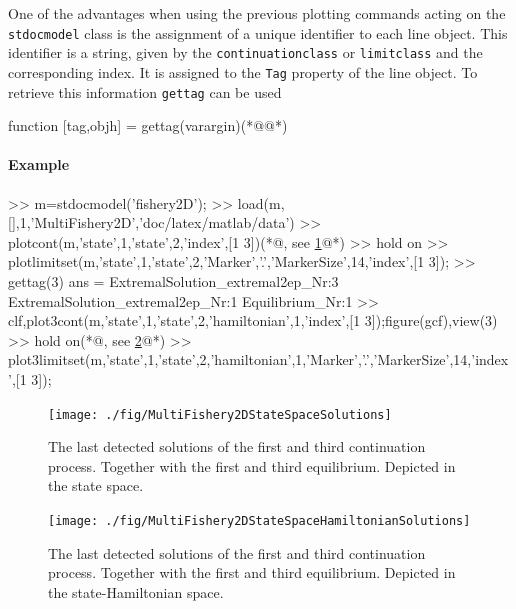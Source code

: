 One of the advantages when using the previous plotting commands acting on the \lstinline+stdocmodel+ class is the assignment of a unique identifier to each line object. This identifier is a string, given by the \lstinline+continuationclass+ or \lstinline+limitclass+ and the corresponding index. It is assigned to the \lstinline+Tag+ property of the line object. To retrieve this information \lstinline+gettag+ can be used
\begin{matlab}
function [tag,objh] = gettag(varargin)(*@@*)
%
%
%
\end{matlab}
\paragraph{Example}
\begin{matlab}
>> m=stdocmodel('fishery2D');
>> load(m,[],1,'MultiFishery2D','doc/latex/matlab/data')
>> plotcont(m,'state',1,'state',2,'index',[1 3])(*@, see \cref{fig:multiplefishery2Dsp}@*)
>> hold on
>> plotlimitset(m,'state',1,'state',2,'Marker','.','MarkerSize',14,'index',[1 3]);
>> gettag(3)
ans =
ExtremalSolution_extremal2ep_Nr:3
ExtremalSolution_extremal2ep_Nr:1
Equilibrium_Nr:1                 
>> clf,plot3cont(m,'state',1,'state',2,'hamiltonian',1,'index',[1 3]);figure(gcf),view(3)
>> hold on(*@, see \cref{fig:multiplefishery2Dshp}@*)
>> plot3limitset(m,'state',1,'state',2,'hamiltonian',1,'Marker','.','MarkerSize',14,'index',[1 3]);
\end{matlab}
\begin{figure}
\centering
\texttt{[image: ./fig/MultiFishery2DStateSpaceSolutions]}
\caption{The last detected solutions of the first and third continuation process. Together with the first and third equilibrium. Depicted in the state space.}
\label{fig:multiplefishery2Dsp}
\end{figure}
\begin{figure}
\centering
\texttt{[image: ./fig/MultiFishery2DStateSpaceHamiltonianSolutions]}
\caption{The last detected solutions of the first and third continuation process. Together with the first and third equilibrium. Depicted in the state-Hamiltonian space.}
\label{fig:multiplefishery2Dshp}
\end{figure}
